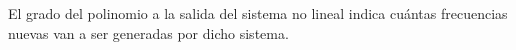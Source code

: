 \documentclass[10pt,portrait, twocolumn]{article}
\begin{document}
\begin{landscape}
\begin{multicols}{3}
%		
%		
%		
%		

El grado del polinomio a la salida del sistema no lineal indica cuántas frecuencias nuevas van a ser generadas por dicho sistema.


\end{multicols}
\end{landscape}
\end{document}
